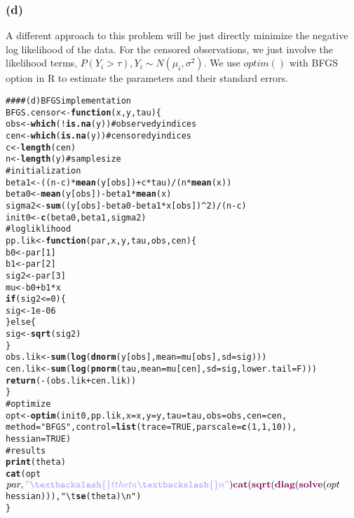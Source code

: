 \documentclass{article}\usepackage{graphicx, color}
\makeatletter
\newcommand{\hlfunctioncall}[1]{\textcolor[rgb]{0.501960784313725,0,0.329411764705882}{\textbf{#1}}}%
\newcommand{\hlstring}[1]{\textcolor[rgb]{0.6,0.6,1}{#1}}%
\newcommand{\hlcomment}[1]{\textcolor[rgb]{0.180392156862745,0.6,0.341176470588235}{#1}}%
\newenvironment{kframe}{%
 \def\at@end@of@kframe{}%
 \ifinner\ifhmode%
  \def\at@end@of@kframe{\end{minipage}}%
  \begin{minipage}{\columnwidth}%
 \fi\fi%
 \def\FrameCommand##1{\hskip\@totalleftmargin \hskip-\fboxsep
 \colorbox{shadecolor}{##1}\hskip-\fboxsep
     \hskip-\linewidth \hskip-\@totalleftmargin \hskip\columnwidth}%
 \MakeFramed {\advance\hsize-\width
   \@totalleftmargin\z@ \linewidth\hsize
   \@setminipage}}%
 {\par\unskip\endMakeFramed%
 \at@end@of@kframe}
\newenvironment{knitrout}{}{} %
\makeatother
\begin{document}
\newpage
\subsubsection*{(d)}
\hspace{12 pt} A different approach to this problem will be just directly minimize the negative log likelihood of the data.
For the censored observations, we just involve the likelihood terms, $P(Y_i>\tau), Y_i\sim N(\mu_i,\sigma^2)$. We use $optim()$
with BFGS option in R to estimate the parameters and their standard errors. 

\begin{knitrout}
\color{fgcolor}\begin{kframe}
\begin{alltt}
\hlcomment{#### (d) BFGS implementation}
BFGS.censor <- \hlfunctioncall{function}(x, y, tau) \{
    obs <- \hlfunctioncall{which}(!\hlfunctioncall{is.na}(y))  \hlcomment{# observed y indices}
    cen <- \hlfunctioncall{which}(\hlfunctioncall{is.na}(y))  \hlcomment{# censored y indices}
    c <- \hlfunctioncall{length}(cen)
    n <- \hlfunctioncall{length}(y)  \hlcomment{# sample size}
\hlcomment{    # initialization}
    beta1 <- ((n - c) * \hlfunctioncall{mean}(y[obs]) + c * tau)/(n * \hlfunctioncall{mean}(x))
    beta0 <- \hlfunctioncall{mean}(y[obs]) - beta1 * \hlfunctioncall{mean}(x)
    sigma2 <- \hlfunctioncall{sum}((y[obs] - beta0 - beta1 * x[obs])^2)/(n - c)
    init0 <- \hlfunctioncall{c}(beta0, beta1, sigma2)
\hlcomment{    # log liklihood}
    pp.lik <- \hlfunctioncall{function}(par, x, y, tau, obs, cen) \{
        b0 <- par[1]
        b1 <- par[2]
        sig2 <- par[3]
        mu <- b0 + b1 * x
        \hlfunctioncall{if} (sig2 <= 0) \{
            sig <- 1e-06
        \} else \{
            sig <- \hlfunctioncall{sqrt}(sig2)
        \}
        obs.lik <- \hlfunctioncall{sum}(\hlfunctioncall{log}(\hlfunctioncall{dnorm}(y[obs], mean = mu[obs], sd = sig)))
        cen.lik <- \hlfunctioncall{sum}(\hlfunctioncall{log}(\hlfunctioncall{pnorm}(tau, mean = mu[cen], sd = sig, lower.tail = F)))
        \hlfunctioncall{return}(-(obs.lik + cen.lik))
    \}
\hlcomment{    # optimize}
    opt <- \hlfunctioncall{optim}(init0, pp.lik, x = x, y = y, tau = tau, obs = obs, cen = cen, 
        method = \hlstring{"BFGS"}, control = \hlfunctioncall{list}(trace = TRUE, parscale = \hlfunctioncall{c}(1, 1, 10)), 
        hessian = TRUE)
\hlcomment{    # results}
    \hlfunctioncall{print}(theta)
    \hlfunctioncall{cat}(opt$par, \hlstring{"\textbackslash{}t theta \textbackslash{}n"})
    \hlfunctioncall{cat}(\hlfunctioncall{sqrt}(\hlfunctioncall{diag}(\hlfunctioncall{solve}(opt$hessian))), \hlstring{"\textbackslash{}t \hlfunctioncall{se}(theta) \textbackslash{}n"})
\}
\end{alltt}
\end{kframe}
\end{knitrout}
\end{document}
